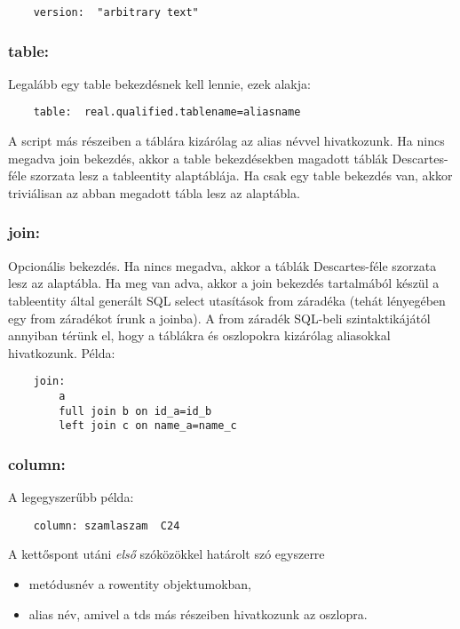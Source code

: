 \begin{verbatim}
    version:  "arbitrary text"
\end{verbatim}
    
\subsubsection*{table:}
    
    Legalább egy table bekezdésnek kell lennie, ezek  alakja:
\begin{verbatim}
    table:  real.qualified.tablename=aliasname
\end{verbatim}
    A script más részeiben a táblára kizárólag az alias névvel
    hivatkozunk. Ha nincs megadva join bekezdés, akkor a table
    bekezdésekben magadott táblák Descartes-féle szorzata lesz 
    a tableentity alaptáblája.
    Ha csak egy table bekezdés van, akkor triviálisan az abban
    megadott tábla lesz az alaptábla.
    
\subsubsection*{join:}
    
    Opcionális bekezdés. Ha nincs megadva, akkor a táblák
    Descartes-féle szorzata lesz  az alaptábla. Ha meg van adva, 
    akkor a join bekezdés tartalmából  készül a tableentity által 
    generált SQL select utasítások  from záradéka (tehát lényegében 
    egy from záradékot írunk a joinba).  A from záradék SQL-beli 
    szintaktikájától annyiban térünk el, hogy a táblákra és oszlopokra 
    kizárólag aliasokkal hivatkozunk. Példa:
\begin{verbatim}
    join: 
        a
        full join b on id_a=id_b
        left join c on name_a=name_c
\end{verbatim}

\subsubsection*{column:}

A legegyszerűbb példa:

\begin{verbatim}
    column: szamlaszam  C24
\end{verbatim}

    A kettőspont utáni {\em első\/} szóközökkel határolt szó egyszerre
    \begin{itemize}
    \item metódusnév a rowentity objektumokban,
    \item alias név, amivel a tds más részeiben hivatkozunk az oszlopra. 
    \end{itemize}
    
